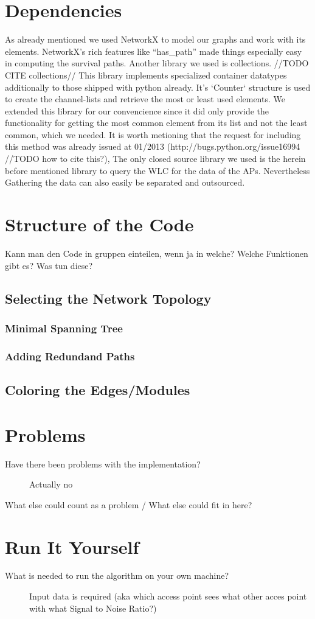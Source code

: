 \section{Dependencies}
  As already mentioned we used NetworkX\cite{hagberg-2008-exploring} to model our graphs and work with its elements.
  NetworkX's rich features like ``has\_path'' made things especially easy in computing the survival paths.
  Another library we used is collections. //TODO CITE collections// 
  This library implements specialized container datatypes additionally to those shipped with python already.
  It's `Counter` structure is used to create the channel-lists and retrieve the most or least used elements.
  We extended this library for our convencience since it did only provide the functionality for getting the most common element from its list and not the least common,
  which we needed. It is worth metioning that the request for including this method was already issued at 01/2013 (http://bugs.python.org/issue16994 //TODO how to cite this?),
  The only closed source library we used is the herein before mentioned library to query the WLC for the data of the APs. Nevertheless Gathering the data can also
  easily be separated and outsourced.
\section{Structure of the Code}
  Kann man den Code in gruppen einteilen, wenn ja in welche? Welche Funktionen gibt es? Was tun diese?
  \subsection{Selecting the Network Topology}
    \subsubsection{Minimal Spanning Tree}
    \subsubsection{Adding Redundand Paths}
  \subsection{Coloring the Edges/Modules}
\section{Problems}
  \begin{description}
   \item[Have there been problems with the implementation?]
   Actually no
   \item[What else could count as a problem / What else could fit in here?]
  \end{description}
\section{Run It Yourself}
  \begin{description}
   \item[What is needed to run the algorithm on your own machine?]
    Input data is required (aka which access point sees what other acces point with what Signal to Noise Ratio?) \newline
  \end{description}
